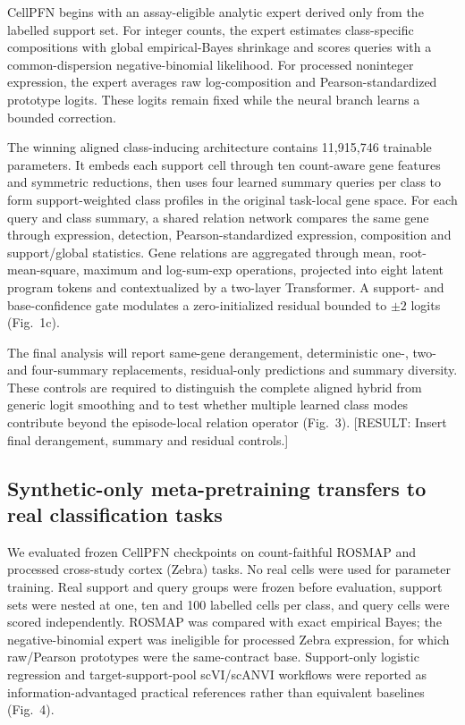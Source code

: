 \documentclass[12pt]{article}
\newcommand{\resultplaceholder}[1]{\textcolor{red!75!black}{[RESULT: #1]}}
\begin{document}
CellPFN begins with an assay-eligible analytic expert derived only from the labelled support set. For integer counts, the expert estimates class-specific compositions with global empirical-Bayes shrinkage and scores queries with a common-dispersion negative-binomial likelihood. For processed noninteger expression, the expert averages raw log-composition and Pearson-standardized prototype logits. These logits remain fixed while the neural branch learns a bounded correction.

The winning aligned class-inducing architecture contains 11,915,746 trainable parameters. It embeds each support cell through ten count-aware gene features and symmetric reductions, then uses four learned summary queries per class to form support-weighted class profiles in the original task-local gene space. For each query and class summary, a shared relation network compares the same gene through expression, detection, Pearson-standardized expression, composition and support/global statistics. Gene relations are aggregated through mean, root-mean-square, maximum and log-sum-exp operations, projected into eight latent program tokens and contextualized by a two-layer Transformer. A support- and base-confidence gate modulates a zero-initialized residual bounded to $\pm2$ logits (Fig.~1c).

The final analysis will report same-gene derangement, deterministic one-, two- and four-summary replacements, residual-only predictions and summary diversity. These controls are required to distinguish the complete aligned hybrid from generic logit smoothing and to test whether multiple learned class modes contribute beyond the episode-local relation operator (Fig.~3). \resultplaceholder{Insert final derangement, summary and residual controls.}

\subsection*{Synthetic-only meta-pretraining transfers to real classification tasks}

We evaluated frozen CellPFN checkpoints on count-faithful ROSMAP and processed cross-study cortex (Zebra) tasks. No real cells were used for parameter training. Real support and query groups were frozen before evaluation, support sets were nested at one, ten and 100 labelled cells per class, and query cells were scored independently. ROSMAP was compared with exact empirical Bayes; the negative-binomial expert was ineligible for processed Zebra expression, for which raw/Pearson prototypes were the same-contract base. Support-only logistic regression and target-support-pool scVI/scANVI workflows were reported as information-advantaged practical references rather than equivalent baselines (Fig.~4).
\end{document}
